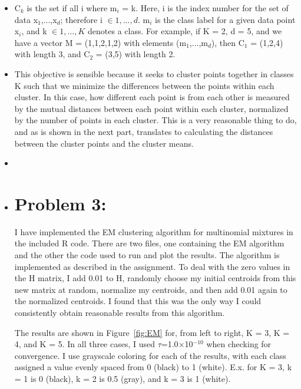 \documentclass[12pt]{article}%
\begin{document}
\begin{itemize}
\item C$_{k}$ is the set if all i where m$_{i}$ = k. Here, i is the index number for the set of data x$_{1}$,...,x$_{d}$; therefore i $\in {1,...,d}$. m$_{i}$ is the class label for a given data point x$_{i}$, and k $\in {1,...,K}$ denotes a class. For example, if K = 2, d = 5, and we have a vector M = (1,1,2,1,2) with elements (m$_1$,...,m$_d$), then C$_{1}$ = (1,2,4) with length 3, and C$_{2}$ = (3,5) with length 2.

\item This objective is sensible because it seeks to cluster points together in classes K such that we minimize the differences between the points within each cluster. In this case, how different each point is from each other is measured by the mutual distances between each point within each cluster, normalized by the number of points in each cluster. This is a very reasonable thing to do, and as is shown in the next part, translates to calculating the distances between the cluster points and the cluster means. 

\item

\item  

\section{Problem 3:}
I have implemented the EM clustering algorithm for multinomial mixtures in the included R code. There are two files, one containing the EM algorithm and the other the code used to run and plot the results. The algorithm is implemented as described in the assignment. To deal with the zero values in the H matrix, I add 0.01 to H, randomly choose my initial centroids from this new matrix at random, normalize my centroids, and then add 0.01 again to the normalized centroids. I found that this was the only way I could consistently obtain reasonable results from this algorithm.

The results are shown in Figure~\ref{fig:EM} for, from left to right, K = 3, K = 4, and K = 5. In all three cases, I used $\tau$=1.0$\times$10$^{-10}$ when checking for convergence. I use grayscale coloring for each of the results, with each class assigned a value evenly spaced from 0 (black) to 1 (white). E.x. for K = 3, k = 1 is 0 (black), k = 2 is 0.5 (gray), and k = 3 is 1 (white). 


\end{itemize}
\end{document}
